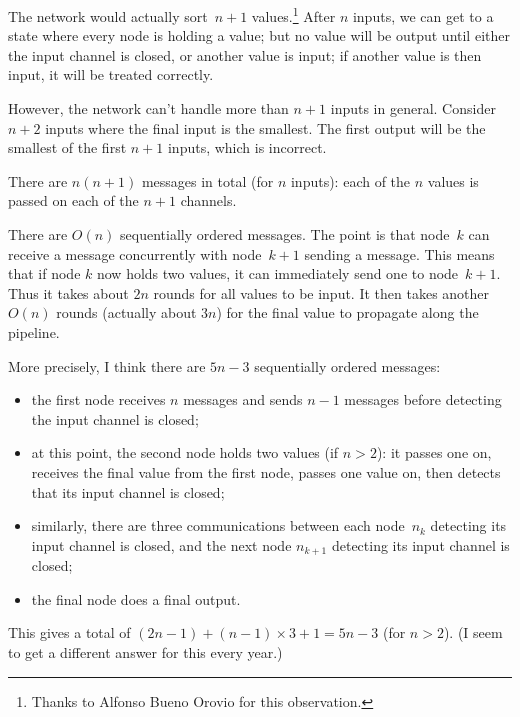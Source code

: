 \begin{answer}
The network would actually sort~$n+1$ values.\footnote{Thanks to Alfonso Bueno
  Orovio for this observation.}  After $n$ inputs, we can get to a state where
every node is holding a value; but no value will be output until either the
input channel is closed, or another value is input; if another value is then
input, it will be treated correctly.

However, the network can't handle more than $n+1$ inputs in general.  Consider
$n+2$ inputs where the final input is the smallest.  The first output will be
the smallest of the first $n+1$ inputs, which is incorrect.


There are $n(n+1)$ messages in total (for $n$ inputs): each of the $n$ values
is passed on each of the $n+1$ channels.

There are $O(n)$ sequentially ordered messages.  The point is that node~$k$
can receive a message concurrently with node~$k+1$ sending a message.  This
means that if node $k$ now holds two values, it can immediately send one to
node~$k+1$.  Thus it  takes about $2n$ rounds for all values to be input.  It
then takes another $O(n)$ rounds (actually about $3n$) for the final value to
propagate along the pipeline.

More precisely, I think there are $5n-3$ sequentially ordered messages:
\begin{itemize}
\item the first node receives $n$ messages and sends $n-1$ messages before
  detecting the input channel is closed; 

\item at this point, the second node holds two values (if $n>2$): it passes
  one on, receives the final value from the first node, passes one value on,
  then detects that its input channel is closed;

\item similarly, there are three communications between each node~$n_k$ 
  detecting its input channel is closed, and the next node $n_{k+1}$ detecting
  its input channel is closed;

\item the final node does a final output. 
\end{itemize}
% 
This gives a total of $(2n-1) + (n-1)\times 3 + 1 = 5n-3$ (for $n>2$).  (I
seem to get a different answer for this every year.)
\end{answer}
